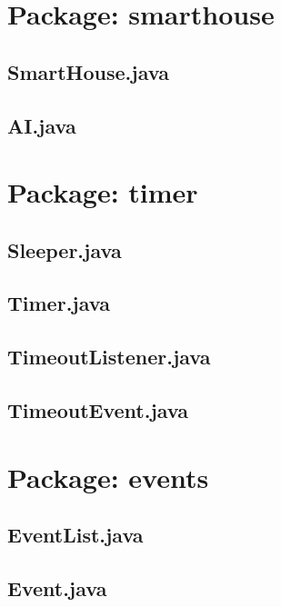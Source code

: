 
\section{Package: smarthouse}
\subsection{SmartHouse.java}

\subsection{AI.java}


\section{Package: timer}
\subsection{Sleeper.java}

\subsection{Timer.java}

\subsection{TimeoutListener.java}

\subsection{TimeoutEvent.java}


\section{Package: events}
\subsection{EventList.java}

\subsection{Event.java}


